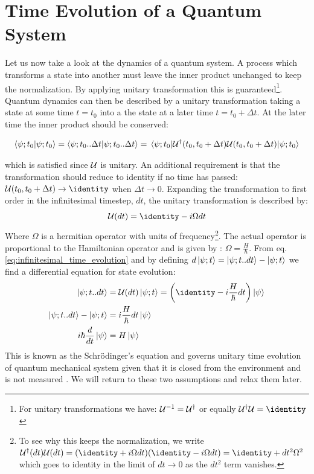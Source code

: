 \section{Time Evolution of a Quantum System}\label{sec:scroedinger}
Let us now take a look at the dynamics of a quantum system. A process which transforms a state into another must leave the inner product unchanged to keep the normalization. By applying unitary transformation this is guaranteed\footnote{For unitary transformations we have: $\mathcal{U}^{-1} = \mathcal{U}^\dagger$ or equally $\unitary^\dagger\unitary = \identity$}. Quantum dynamics can then be described by a unitary transformation taking a state at some time $t = t_0$ into a the state at a later time $t = t_0 + \Delta t$. At the later time the inner product should be conserved:
\begin{fullwidth}
\begin{equation}
    \braket{\psi; t_0}{\psi; t_0} = \braket{\psi; t_0 .. \Delta t}{\psi; t_0 .. \Delta t} = \mel{\psi; t_0}{\mathcal{U}^\dagger (t_0, t_0 +\Delta t) \mathcal{U}(t_0, t_0 +\Delta t)}{\psi; t_0} 
\end{equation}
\end{fullwidth}
which is satisfied since $\mathcal{U}$ is unitary. An additional requirement is that the transformation should reduce to identity if no time has passed: $\unitary(t_0, t_0+\Delta t) \to \identity$ when $\Delta t \to 0$. Expanding the transformation to first order in the infinitesimal timestep, $dt$, the unitary transformation is described by:
\begin{equation}\label{eq:infinitesimal_time_evolution}
    \unitary(dt) = \identity - i \Omega dt
\end{equation}
Where $\Omega$ is a hermitian operator with units of frequency\footnote{To see why this keeps the normalization, we write $\unitary^\dagger(dt)\unitary(dt) = (\identity + i \Omega dt)(\identity - i \Omega dt) = \identity + dt^2 \Omega^2$ which goes to identity in the limit of $dt \to 0$ as the $dt^2$ term vanishes.}. 
The actual operator is proportional to the Hamiltonian operator and is given by : $\Omega = \frac{H}{\hbar}$. From eq. \ref{eq:infinitesimal_time_evolution} and by defining $d\ket{\psi; t} = \ket{\psi; t..dt} - \ket{\psi; t} $ we find a differential equation for state evolution:
\begin{align}
    \ket{\psi; t..dt} &= \unitary(dt) \ket{\psi; t} = \left(\identity - i \frac{H}{\hbar}   dt\right) \ket{\psi} \\
    \ket{\psi; t..dt} - \ket{\psi; t} &= i \frac{H}{\hbar}   dt \ket{\psi} \\
    i \hbar \frac{d}{dt}\ket{\psi} &=  H \ket{\psi}
\end{align}
This is known as the Schrödinger's equation and governs unitary time evolution of quantum mechanical system given that it is closed from the environment and is not measured \cite{sakurai_modern_2021}. We will return to these two assumptions and relax them later.

